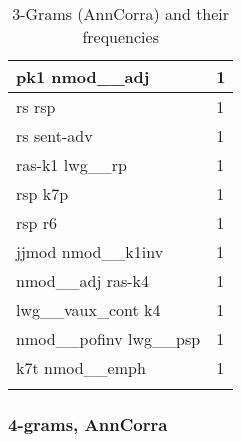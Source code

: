 \documentclass[a4 paper]{article}
\begin{document}
\begin{longtable}{p{}p{}}
pk1 nmod\_\_adj  & 1 \\ \midrule
rs rsp  & 1 \\ \midrule
rs sent-adv  & 1 \\ \midrule
ras-k1 lwg\_\_rp  & 1 \\ \midrule
rsp k7p  & 1 \\ \midrule
rsp r6  & 1 \\ \midrule
jjmod nmod\_\_k1inv  & 1 \\ \midrule
nmod\_\_adj ras-k4  & 1 \\ \midrule
lwg\_\_vaux\_cont k4  & 1 \\ \midrule
nmod\_\_pofinv lwg\_\_psp  & 1 \\ \midrule
k7t nmod\_\_emph  & 1 \\ \midrule
    \caption{3-Grams (AnnCorra) and their frequencies}
\label{tab:ngram3ann}
\end{longtable}
    

\subsubsection{4-grams, AnnCorra}
\end{document}
